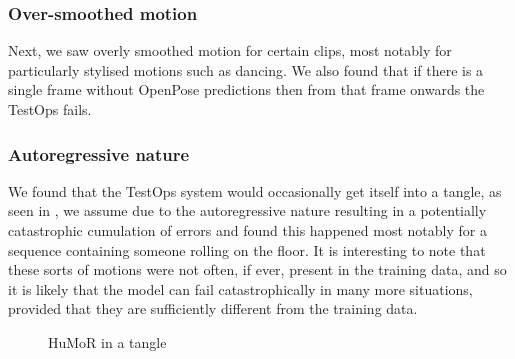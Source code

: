 \subsubsection{Over-smoothed motion}
Next, we saw overly smoothed motion for certain clips, most notably for particularly stylised motions such as dancing.  We also found that if there is a single frame without OpenPose predictions then from that frame onwards the TestOps fails. 

\subsubsection{Autoregressive nature}
We found that the TestOps system would occasionally get itself into a tangle, as seen in , we assume due to the autoregressive nature resulting in a potentially catastrophic cumulation of errors and found this happened most notably for a sequence containing someone rolling on the floor. It is interesting to note that these sorts of motions were not often, if ever, present in the training data, and so it is likely that the model can fail catastrophically in many more situations, provided that they are sufficiently different from the training data.

\begin{figure}[!ht]
    \centering
    \hfil
    \hfil
    \caption{HuMoR in a tangle}
    \label{fig:humor_bad_mess}
\end{figure}

